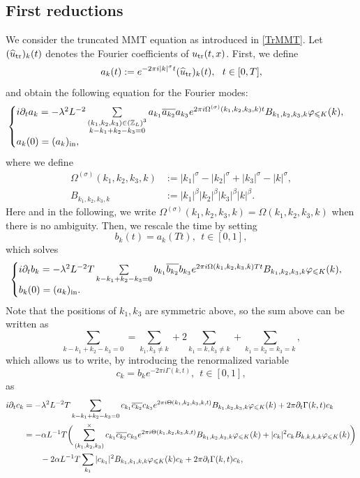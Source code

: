 \documentclass[UTF-8,reqno]{amsart}
\numberwithin{equation}{section}
\theoremstyle{definition}
\def\leq{\leqslant}
\def\leq{\leqslant}
\begin{document}
 \subsection{First reductions}\label{reductions}
We consider the truncated MMT equation as introduced in \eqref{TrMMT}.
 Let $(\widehat{u}_{\rm tr})_k(t)$ denotes the Fourier coefficients of $u_{\rm tr}(t,x)$. First, we define $$a_k(t):= e^{-2\pi i|k|^\sigma t} (\widehat u_{\rm tr})_k(t),\ \ t\in[0,T],$$ and obtain the following equation for the Fourier modes:
 \begin{equation*}%
\begin{cases}
 i \partial_t{a_k} =- \lambda^2 L^{-2} \sum\limits_{\substack{(k_1,k_2,k_{3}) \in (\mathbb{Z}_L)^3 \\ k - k_1 + k_2 -k_3 = 0}} a_{k_1}\overline{a_{k_2}}  a_{k_3} e^{2\pi i \Omega^{(\sigma)}(k_1,k_2,k_3,k)t}B_{k_1,k_2,k_3,k}\varphi_{\leq K}(k), \\ 
a_k(0) =(a_k)_{\rm in},
\end{cases}
\end{equation*}
where we define 
\begin{align*}
\Omega^{(\sigma)}(k_1,k_2,k_3,k) &:=|k_1|^\sigma-|k_2|^\sigma+|k_3|^\sigma-|k|^\sigma,\\ B_{k_1,k_2,k_3,k}&:=|k_1|^\beta|k_2|^\beta|k_3|^\beta|k|^\beta.
\end{align*}
Here and in the following, we write $\Omega^{(\sigma)}(k_1,k_2,k_3,k)=\Omega(k_1,k_2,k_3,k)$ when there is no ambiguity.
Then, we rescale the time by setting
$$
b_k(t)=a_k(Tt),\ \ t\in[0,1],
$$ 
which solves 
\begin{equation*}%
\begin{cases}
 i \partial_t{b_k} =- \lambda^2 L^{-2} T\sum\limits_{k - k_1 + k_2 -k_3 = 0} b_{k_1}\overline{b_{k_2}}  b_{k_3} e^{2\pi i \Omega(k_1,k_2,k_3,k)Tt}B_{k_1,k_2,k_3,k}\varphi_{\leq K}(k),\\
b_k(0) =(a_k)_{\rm in}.
\end{cases}
\end{equation*}
Note that the positions of $k_1,k_3$ are symmetric above, so the sum above can be written as 
$$
\sum\limits_{ k - k_1 + k_2 -k_3 = 0}= \sum_{k_1, k_3\neq k}+2\sum_{k_1=k,k_3\neq k}+\sum_{k_1=k_2=k_3=k},
$$
which allows us to write, by introducing the renormalized variable
$$c_k=b_ke^{-2\pi i \Gamma(k,t)},\ \ t\in[0,1],$$
as
\begin{align}\label{ipartck}
 i \partial_t{c_k}& = - \lambda^2 L^{-2} T\sum\limits_{k - k_1 + k_2 -k_3 = 0} c_{k_1}\overline{c_{k_2}}  c_{k_3} e^{2\pi i \Theta(k_1,k_2,k_3,k,t)}B_{k_1,k_2,k_3,k}\varphi_{\leq K}(k) +2\pi\partial_t\Gamma(k,t)c_k\notag\\ 
& = -\alpha L^{-1} T
\bigg(   \sum\limits_{(k_1,k_2, k_{3})}^{\times} c_{k_1}\overline{c_{k_2}}  c_{k_3} e^{2\pi i \Theta(k_1,k_2,k_3,k,t)}B_{k_1,k_2,k_3,k}\varphi_{\leq K}(k) +|c_k|^2c_kB_{k,k,k,k}\varphi_{\leq K}(k) \bigg)\notag\\
 &\qquad- 2\alpha L^{-1} T\sum_{k_1}|c_{k_1}|^2B_{k_1,k_1,k,k}\varphi_{\leq K}(k)c_k+2\pi\partial_t\Gamma(k,t)c_k,
\end{align}
\end{document}
